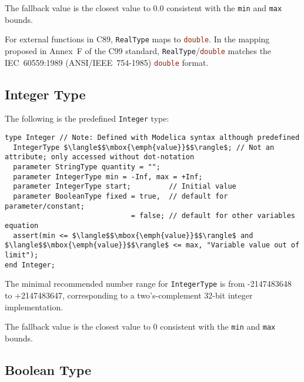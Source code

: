 The fallback value is the closest value to $0.0$ consistent with the \lstinline!min! and \lstinline!max! bounds.

\begin{nonnormative}
For external functions in C89, \lstinline!RealType! maps to \lstinline[language=C]!double!.  In the mapping proposed in Annex~F of the C99 standard,
\lstinline!RealType!/\lstinline[language=C]!double! matches the IEC~60559:1989 (ANSI/IEEE~754-1985) \lstinline[language=C]!double! format.
\end{nonnormative}

\subsection{Integer Type}\label{integer-type}

The following is the predefined \lstinline!Integer! type:
\begin{lstlisting}[language=modelica]
type Integer // Note: Defined with Modelica syntax although predefined
  IntegerType $\langle$$\mbox{\emph{value}}$$\rangle$; // Not an attribute; only accessed without dot-notation
  parameter StringType quantity = "";
  parameter IntegerType min = -Inf, max = +Inf;
  parameter IntegerType start;         // Initial value
  parameter BooleanType fixed = true,  // default for parameter/constant;
                              = false; // default for other variables
equation
  assert(min <= $\langle$$\mbox{\emph{value}}$$\rangle$ and $\langle$$\mbox{\emph{value}}$$\rangle$ <= max, "Variable value out of limit");
end Integer;
\end{lstlisting}%
%
%
%
%

The minimal recommended number range for \lstinline!IntegerType! is from -2147483648 to +2147483647, corresponding to a two's-complement 32-bit integer implementation.

The fallback value is the closest value to $0$ consistent with the \lstinline!min! and \lstinline!max! bounds.

\subsection{Boolean Type}\label{boolean-type}

